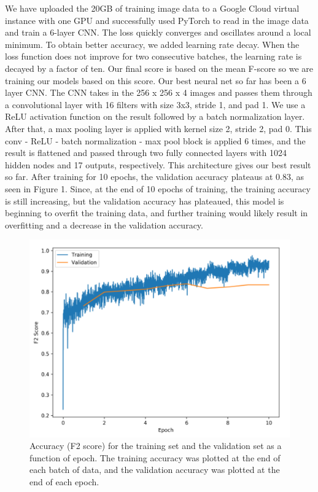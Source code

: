 \documentclass[10pt,twocolumn,letterpaper]{article}
\begin{document}
We have uploaded the 20GB of training image data to a Google Cloud virtual instance with one GPU and successfully used PyTorch to read in the image data and train a 6-layer CNN. The loss quickly converges and oscillates around a local minimum. To obtain better accuracy, we added learning rate decay. When the loss function does not improve for two consecutive batches, the learning rate is decayed by a factor of ten. Our final score is based on the mean F-score so we are training our models based on this score. Our best neural net so far has been a 6 layer CNN. The CNN takes in the 256 x 256 x 4 images and passes them through a convolutional layer with 16 filters with size 3x3, stride 1, and pad 1. We use a ReLU activation function on the result followed by a batch normalization layer. After that, a max pooling layer is applied with kernel size 2, stride 2, pad 0. This conv - ReLU - batch normalization - max pool block is applied 6 times, and the result is flattened and passed through two fully connected layers with 1024 hidden nodes and 17 outputs, respectively. This architecture gives our best result so far. After training for 10 epochs, the validation accuracy plateaus at 0.83, as seen in Figure 1. Since, at the end of 10 epochs of training, the training accuracy is still increasing, but the validation accuracy has plateaued, this model is beginning to overfit the training data, and further training would likely result in overfitting and a decrease in the validation accuracy.


\begin{figure}
    \includegraphics[width=\columnwidth]{AccuracyCurve.png}
    \caption{Accuracy (F2 score) for the training set and the validation set as a function of epoch. The training accuracy was plotted at the end of each batch of data, and the validation accuracy was plotted at the end of each epoch.}
\end{figure}
\end{document}
